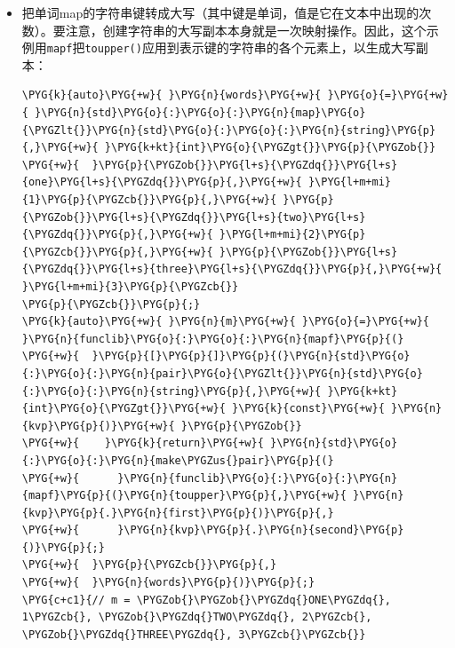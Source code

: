 \begin{itemize}

\item 把单词map的字符串键转成大写（其中键是单词，值是它在文本中出现的次数）。要注意，创建字符串的大写副本本身就是一次映射操作。因此，这个示例用\texttt{mapf}把\texttt{toupper()}应用到表示键的字符串的各个元素上，以生成大写副本：



\begin{codeblockbg}
\begin{Verbatim}[commandchars=\\\{\},breaklines=true,breakanywhere=true,fontsize=\codefont,xleftmargin=17bp]
\PYG{k}{auto}\PYG{+w}{ }\PYG{n}{words}\PYG{+w}{ }\PYG{o}{=}\PYG{+w}{ }\PYG{n}{std}\PYG{o}{:}\PYG{o}{:}\PYG{n}{map}\PYG{o}{\PYGZlt{}}\PYG{n}{std}\PYG{o}{:}\PYG{o}{:}\PYG{n}{string}\PYG{p}{,}\PYG{+w}{ }\PYG{k+kt}{int}\PYG{o}{\PYGZgt{}}\PYG{p}{\PYGZob{}}
\PYG{+w}{  }\PYG{p}{\PYGZob{}}\PYG{l+s}{\PYGZdq{}}\PYG{l+s}{one}\PYG{l+s}{\PYGZdq{}}\PYG{p}{,}\PYG{+w}{ }\PYG{l+m+mi}{1}\PYG{p}{\PYGZcb{}}\PYG{p}{,}\PYG{+w}{ }\PYG{p}{\PYGZob{}}\PYG{l+s}{\PYGZdq{}}\PYG{l+s}{two}\PYG{l+s}{\PYGZdq{}}\PYG{p}{,}\PYG{+w}{ }\PYG{l+m+mi}{2}\PYG{p}{\PYGZcb{}}\PYG{p}{,}\PYG{+w}{ }\PYG{p}{\PYGZob{}}\PYG{l+s}{\PYGZdq{}}\PYG{l+s}{three}\PYG{l+s}{\PYGZdq{}}\PYG{p}{,}\PYG{+w}{ }\PYG{l+m+mi}{3}\PYG{p}{\PYGZcb{}}
\PYG{p}{\PYGZcb{}}\PYG{p}{;}
\PYG{k}{auto}\PYG{+w}{ }\PYG{n}{m}\PYG{+w}{ }\PYG{o}{=}\PYG{+w}{ }\PYG{n}{funclib}\PYG{o}{:}\PYG{o}{:}\PYG{n}{mapf}\PYG{p}{(}
\PYG{+w}{  }\PYG{p}{[}\PYG{p}{]}\PYG{p}{(}\PYG{n}{std}\PYG{o}{:}\PYG{o}{:}\PYG{n}{pair}\PYG{o}{\PYGZlt{}}\PYG{n}{std}\PYG{o}{:}\PYG{o}{:}\PYG{n}{string}\PYG{p}{,}\PYG{+w}{ }\PYG{k+kt}{int}\PYG{o}{\PYGZgt{}}\PYG{+w}{ }\PYG{k}{const}\PYG{+w}{ }\PYG{n}{kvp}\PYG{p}{)}\PYG{+w}{ }\PYG{p}{\PYGZob{}}
\PYG{+w}{    }\PYG{k}{return}\PYG{+w}{ }\PYG{n}{std}\PYG{o}{:}\PYG{o}{:}\PYG{n}{make\PYGZus{}pair}\PYG{p}{(}
\PYG{+w}{      }\PYG{n}{funclib}\PYG{o}{:}\PYG{o}{:}\PYG{n}{mapf}\PYG{p}{(}\PYG{n}{toupper}\PYG{p}{,}\PYG{+w}{ }\PYG{n}{kvp}\PYG{p}{.}\PYG{n}{first}\PYG{p}{)}\PYG{p}{,}
\PYG{+w}{      }\PYG{n}{kvp}\PYG{p}{.}\PYG{n}{second}\PYG{p}{)}\PYG{p}{;}
\PYG{+w}{  }\PYG{p}{\PYGZcb{}}\PYG{p}{,}
\PYG{+w}{  }\PYG{n}{words}\PYG{p}{)}\PYG{p}{;}
\PYG{c+c1}{// m = \PYGZob{}\PYGZob{}\PYGZdq{}ONE\PYGZdq{}, 1\PYGZcb{}, \PYGZob{}\PYGZdq{}TWO\PYGZdq{}, 2\PYGZcb{}, \PYGZob{}\PYGZdq{}THREE\PYGZdq{}, 3\PYGZcb{}\PYGZcb{}}
\end{Verbatim}
\end{codeblockbg}




\end{itemize}
